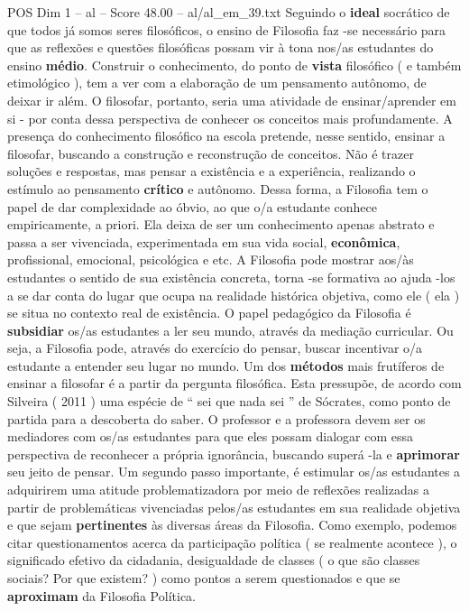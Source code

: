 \begin{textsample}{POS Dim 1 – al – Score 48.00 – al/al\_em\_39.txt}
Seguindo o \textbf{ideal} socrático de que todos já somos seres filosóficos, o ensino de Filosofia faz -se necessário para que as reflexões e questões filosóficas possam vir à tona nos/as estudantes do ensino \textbf{médio}.
Construir o conhecimento, do ponto de \textbf{vista} filosófico ( e também etimológico ), tem a ver com a elaboração de um pensamento autônomo, de deixar ir além.
O filosofar, portanto, seria uma atividade de ensinar/aprender em si - por conta dessa perspectiva de conhecer os conceitos mais profundamente.
A presença do conhecimento filosófico na escola pretende, nesse sentido, ensinar a filosofar, buscando a construção e reconstrução de conceitos.
Não é trazer soluções e respostas, mas pensar a existência e a experiência, realizando o estímulo ao pensamento \textbf{crítico} e autônomo.
Dessa forma, a Filosofia tem o papel de dar complexidade ao óbvio, ao que o/a estudante conhece empiricamente, a priori.
Ela deixa de ser um conhecimento apenas abstrato e passa a ser vivenciada, experimentada em sua vida social, \textbf{econômica}, profissional, emocional, psicológica e etc.
A Filosofia pode mostrar aos/às estudantes o sentido de sua existência concreta, torna -se formativa ao ajuda -los a se dar conta do lugar que ocupa na realidade histórica objetiva, como ele ( ela ) se situa no contexto real de existência.
O papel pedagógico da Filosofia é \textbf{subsidiar} os/as estudantes a ler seu mundo, através da mediação curricular.
Ou seja, a Filosofia pode, através do exercício do pensar, buscar incentivar o/a estudante a entender seu lugar no mundo.
Um dos \textbf{métodos} mais frutíferos de ensinar a filosofar é a partir da pergunta filosófica.
Esta pressupõe, de acordo com Silveira ( 2011 ) uma espécie de “ sei que nada sei ” de Sócrates, como ponto de partida para a descoberta do saber.
O professor e a professora devem ser os mediadores com os/as estudantes para que eles possam dialogar com essa perspectiva de reconhecer a própria ignorância, buscando superá -la e \textbf{aprimorar} seu jeito de pensar.
Um segundo passo importante, é estimular os/as estudantes a adquirirem uma atitude problematizadora por meio de reflexões realizadas a partir de problemáticas vivenciadas pelos/as estudantes em sua realidade objetiva e que sejam \textbf{pertinentes} às diversas áreas da Filosofia.
Como exemplo, podemos citar questionamentos acerca da participação política ( se realmente acontece ), o significado efetivo da cidadania, desigualdade de classes ( o que são classes sociais?
Por que existem? ) como pontos a serem questionados e que se \textbf{aproximam} da Filosofia Política.

\end{textsample}
